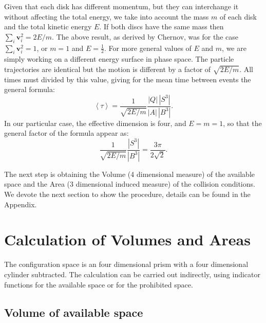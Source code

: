 \documentclass[letterpaper,10pt, jcp, aps]{revtex4-1}
\newcommand{\mean}[1]{\left \langle #1 \right \rangle}
\newcommand{\vv}{\mathbf{v}}
\begin{document}
Given that each disk has different momentum, but
they can interchange it without affecting the
total energy, we take into account the mass $m$ of each disk 
and the total kinetic energy $E$.
If both discs have the same mass then $\sum_i \vv_i^2 = 2E / m$.
The above result, as derived by Chernov, 
was for the case $\sum_i \vv_i^2 = 1$, or $m=1$ and $E=\frac{1}{2}$.  
For more general values of $E$ and $m$, 
we are simply working on a different energy surface in phase space. 
The particle trajectories are identical but the motion is different
by a factor of
$\sqrt{2E/m}$. All times must divided by this value, 
giving for
the mean time between events the general formula:
\begin{equation} \label{meantimegeneral}
  \mean{\tau} =  \frac{1}{\sqrt{2E / m}} 
\frac{|Q| \, |S^3|} {|A| \, |B^3|}.	
\end{equation}
In our particular case, the effective dimension is four,
and $E=m=1$, so that the general factor of the formula appear as:
\begin{equation} \label{meantimegeneralredux}
   \frac{1}{\sqrt{2E / m}} 
\frac{|S^3|}{|B^3|}=\frac{3\pi}{2\sqrt{2}}.	 
\end{equation}

The next step is obtaining the Volume (4 dimensional measure) of
the available space and the Area (3 dimensional induced measure) of
the collision conditions. We devote the next section to
show the procedure, details can be found in the Appendix.


\section{Calculation of Volumes and Areas}

The configuration
space is an four dimensional prism with a four dimensional
cylinder subtracted.
The calculation can be carried out indirectly,
 using indicator functions for the
available space or for the prohibited space.

\subsection{Volume of available space}
\end{document}
